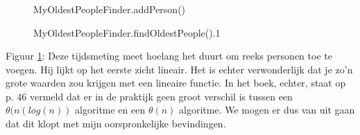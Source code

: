 \documentclass[10pt,a4paper]{report}
\begin{document}
\subsubsection*{ }
\begin{figure}[h!]
    \centering
    \caption{MyOldestPeopleFinder.addPerson()}
    \label{fig:MOPF-aP}
\end{figure}
\begin{figure}[b!]
    \centering
    \caption{MyOldestPeopleFinder.findOldestPeople().1}
    \label{fig:MOPF-fOP1}
\end{figure}

Figuur \ref{fig:MOPF-aP}: Deze tijdsmeting meet hoelang het duurt om reeks personen toe te voegen. Hij lijkt op het eerste zicht lineair. Het is echter verwonderlijk dat je zo'n grote waarden zou krijgen met een lineaire functie.  In het boek, echter, staat op p. 46 vermeld dat er in de praktijk geen groot verschil is tussen een $\theta(n(log(n))$ algoritme en een $\theta(n)$ algoritme. We mogen er dus van uit gaan dat dit klopt met mijn oorspronkelijke bevindingen.
\end{document}
